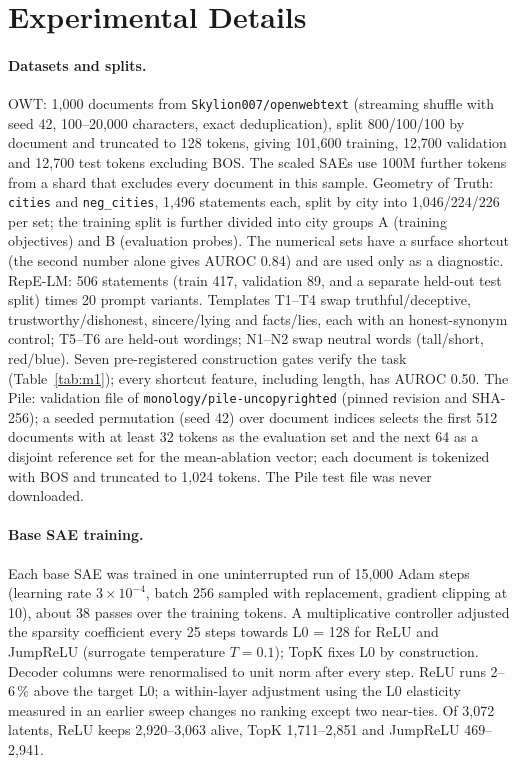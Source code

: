 \section{Experimental Details}\label{app:details}

\paragraph{Datasets and splits.} OWT: 1{,}000 documents from \texttt{Skylion007/openwebtext} (streaming shuffle with
seed 42, 100--20{,}000 characters, exact deduplication), split 800/100/100 by document and truncated to 128 tokens,
giving 101{,}600 training, 12{,}700 validation and 12{,}700 test tokens excluding BOS. The scaled SAEs use 100M further
tokens from a shard that excludes every document in this sample. Geometry of Truth: \texttt{cities} and
\texttt{neg\_cities}, 1{,}496 statements each, split by city into 1{,}046/224/226 per set; the training split is further
divided into city groups A (training objectives) and B (evaluation probes). The numerical sets have a surface shortcut
(the second number alone gives AUROC 0.84) and are used only as a diagnostic. RepE-LM: 506 statements (train 417,
validation 89, and a separate held-out test split) times 20 prompt variants. Templates T1--T4 swap truthful/deceptive,
trustworthy/dishonest, sincere/lying and facts/lies, each with an honest-synonym control; T5--T6 are held-out wordings;
N1--N2 swap neutral words (tall/short, red/blue). Seven pre-registered construction gates verify the task
(Table~\ref{tab:m1}); every shortcut feature, including length, has AUROC 0.50. The Pile: validation file of
\texttt{monology/pile-uncopyrighted} (pinned revision and SHA-256); a seeded permutation (seed 42) over document indices
selects the first 512 documents with at least 32 tokens as the evaluation set and the next 64 as a disjoint reference
set for the mean-ablation vector; each document is tokenized with BOS and truncated to 1{,}024 tokens. The Pile test
file was never downloaded.

\paragraph{Base SAE training.} Each base SAE was trained in one uninterrupted run of 15{,}000 Adam steps (learning rate
$3\times10^{-4}$, batch 256 sampled with replacement, gradient clipping at 10), about 38 passes over the training
tokens. A multiplicative controller adjusted the sparsity coefficient every 25 steps towards L0 = 128 for ReLU and
JumpReLU (surrogate temperature $T=0.1$); TopK fixes L0 by construction. Decoder columns were renormalised to unit norm
after every step. ReLU runs 2--6\,\% above the target L0; a within-layer adjustment using the L0 elasticity measured in
an earlier sweep changes no ranking except two near-ties. Of 3{,}072 latents, ReLU keeps 2{,}920--3{,}063 alive, TopK
1{,}711--2{,}851 and JumpReLU 469--2{,}941.

